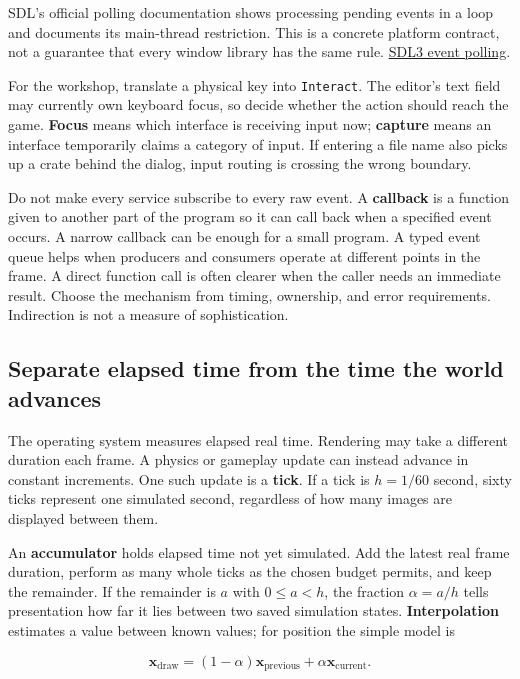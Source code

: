 SDL's official polling documentation shows processing pending events in a loop and documents its main-thread restriction. This is a concrete platform contract, not a guarantee that every window library has the same rule. \href{https://wiki.libsdl.org/SDL3/SDL_PollEvent}{SDL3 event polling}.

For the workshop, translate a physical key into \texttt{Interact}. The editor's text field may currently own keyboard focus, so decide whether the action should reach the game. \textbf{Focus} means which interface is receiving input now; \textbf{capture} means an interface temporarily claims a category of input. If entering a file name also picks up a crate behind the dialog, input routing is crossing the wrong boundary.

Do not make every service subscribe to every raw event. A \textbf{callback} is a function given to another part of the program so it can call back when a specified event occurs. A narrow callback can be enough for a small program. A typed event queue helps when producers and consumers operate at different points in the frame. A direct function call is often clearer when the caller needs an immediate result. Choose the mechanism from timing, ownership, and error requirements. Indirection is not a measure of sophistication.

\subsection{Separate elapsed time from the time the world advances}\label{05-engine-i-ch013-separate-elapsed-time-from-the-time-the-world-advances}

The operating system measures elapsed real time. Rendering may take a different duration each frame. A physics or gameplay update can instead advance in constant increments. One such update is a \textbf{tick}. If a tick is \(h=1/60\) second, sixty ticks represent one simulated second, regardless of how many images are displayed between them.

An \textbf{accumulator} holds elapsed time not yet simulated. Add the latest real frame duration, perform as many whole ticks as the chosen budget permits, and keep the remainder. If the remainder is \(a\) with \(0\le a<h\), the fraction \(\alpha=a/h\) tells presentation how far it lies between two saved simulation states. \textbf{Interpolation} estimates a value between known values; for position the simple model is

\[
\mathbf{x}_{\mathrm{draw}}=(1-\alpha)\mathbf{x}_{\mathrm{previous}}+\alpha\mathbf{x}_{\mathrm{current}}.
\]

